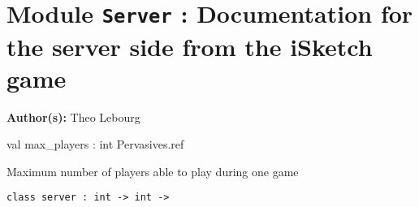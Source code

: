 \documentclass[11pt]{article}
\begin{document}
\tableofcontents
\section{Module {\tt{Server}} : Documentation for the server side from the iSketch game}
\label{module:Server}


{\bf Author(s): }Theo Lebourg



\ocamldocvspace{0.5cm}



\label{val:Server.max-underscoreplayers}\begin{ocamldoccode}
val max_players : int Pervasives.ref
\end{ocamldoccode}
\begin{ocamldocdescription}
Maximum number of players able to play during one game


\end{ocamldocdescription}




\begin{ocamldoccode}
{\tt{class server : }}{\tt{int -> int -> }}\end{ocamldoccode}
\label{class:Server.server}
\end{document}
